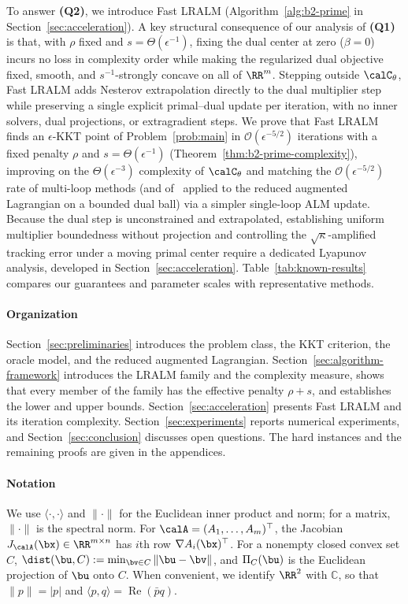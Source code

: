 To answer \textbf{(Q2)}, we introduce Fast LRALM (Algorithm~\ref{alg:b2-prime}
in Section~\ref{sec:acceleration}). A key structural consequence of our
analysis of \textbf{(Q1)} is that, with $\rho$ fixed and
$s=\Theta(\epsilon^{-1})$, fixing the dual center at zero ($\beta=0$) incurs no
loss in complexity order while making the regularized dual objective fixed,
smooth, and $s^{-1}$-strongly concave on all of $\RR^m$. Stepping outside
$\calC_\theta$, Fast LRALM adds Nesterov extrapolation directly to the dual
multiplier step while preserving a single explicit primal--dual update per
iteration, with no inner solvers, dual projections, or extragradient steps.
We prove that Fast LRALM finds an $\epsilon$-KKT point of
Problem~\eqref{prob:main} in $\mathcal O(\epsilon^{-5/2})$ iterations with a
fixed penalty $\rho$ and $s=\Theta(\epsilon^{-1})$
(Theorem~\ref{thm:b2-prime-complexity}), improving on the
$\Theta(\epsilon^{-3})$ complexity of $\calC_\theta$ and matching the
$\mathcal O(\epsilon^{-5/2})$ rate of multi-loop methods (and
of~\cite{zhang2026matching} applied to the reduced augmented Lagrangian on a
bounded dual ball) via a simpler single-loop ALM update. Because the dual step
is unconstrained and extrapolated, establishing uniform multiplier boundedness
without projection and controlling the $\sqrt{\kappa}$-amplified tracking error
under a moving primal center require a dedicated Lyapunov analysis, developed
in Section~\ref{sec:acceleration}. Table~\ref{tab:known-results} compares our
guarantees and parameter scales with representative methods.

\paragraph{Organization}
Section~\ref{sec:preliminaries} introduces the problem class, the KKT
criterion, the oracle model, and the reduced augmented Lagrangian.
Section~\ref{sec:algorithm-framework} introduces the LRALM family and the
complexity measure, shows that every member of the family has the effective
penalty $\rho+s$, and establishes the lower and upper bounds.
Section~\ref{sec:acceleration} presents Fast LRALM and its iteration
complexity. Section~\ref{sec:experiments} reports numerical experiments, and
Section~\ref{sec:conclusion} discusses open questions. The hard instances
and the remaining proofs are given in the appendices.

\paragraph{Notation}
We use $\langle\cdot,\cdot\rangle$ and $\|\cdot\|$ for the
Euclidean inner product and norm; for a matrix, $\|\cdot\|$ is the spectral
norm. For $\calA=(A_1,\ldots,A_m)^\top$, the Jacobian
$J_{\calA}(\bx)\in\RR^{m\times n}$ has $i$th row $\nabla A_i(\bx)^\top$. For a
nonempty closed convex set $C$, $\dist(\bu,C):=\min_{\bv\in C}\|\bu-\bv\|$, and
$\Pi_C(\bu)$ is the Euclidean projection of $\bu$ onto $C$. When convenient, we
identify $\RR^2$ with $\mathbb C$, so that $\|p\|=|p|$ and
$\langle p,q\rangle=\operatorname{Re}(\bar pq)$.

